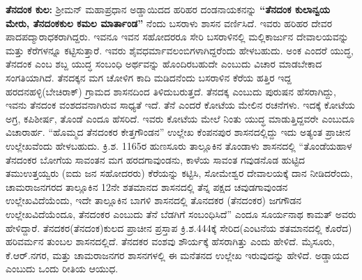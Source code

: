 \textbf{ತೆನದಂಕ ಕುಲ:} ಶ‍್ರೀಮನ್​ ಮಹಾಪ್ರಧಾನ ಅಡ್ಡಾಯಿದದ ಹರಿಹರ ದಂಡನಾಯಕನನ್ನು \textbf{“ತೆನದಂಕ ಕುಲಾನ್ವಯ ಮೇರು, ತೆನದಂಕಕುಲ ಕಮಲ ಮಾರ್ತಾಂಡ”} ನೆಂದು ಬಸರಾಳು ಶಾಸನ ವರ್ಣಿಸಿದೆ. ಇವರು ಹರಿಹರ ದೇವರ ಪಾದಪದ್ಮಾರಾಧಕರಾಗಿದ್ದರು. ಇವನೂ ಇವನ ಸಹೋದರರೂ ಸೇರಿ ಬಸರಾಳಿನಲ್ಲಿ ಮಲ್ಲಿಕಾರ್ಜುನ ದೇವಾಲಯವನ್ನು ಮತ್ತು ಕೆರೆಗಳನ್ನೂ ಕಟ್ಟಿಸುತ್ತಾರೆ. ಇವರು ಶೈವಧರ್ಮಾವಲಂಬಿಗಳಾಗಿದ್ದರೆಂದು ಹೇಳಬಹುದು. ಅಂಕ ಎಂದರೆ ಯುದ್ಧ, ತೆನದಂಕ ಎಂಬ ಶಬ್ದ ಯುದ್ಧ ಸಂಬಂಧಿ ಅರ್ಥವನ್ನು ಹೊಂದಿರಬಹುದೇ ಎಂಬುದು ವಿಚಾರ ಮಾಡಬೇಕಾದ ಸಂಗತಿಯಾಗಿದೆ. ತೆನದಕ್ಕನ ಮಗ ಚೋಳಿಗ ಕಾದಿ ಮಡಿದನೆಂದು ಬಸರಾಳಿನ ಕೆರೆಯ ಹತ್ತಿರ ಇದ್ದ ಹರದನಹಳ್ಳಿ(ಬೇಚಿರಾಕ್​) ಗ್ರಾಮದ ಶಾಸನದಿಂದ ತಿಳಿದುಬರುತ್ತದೆ. ತೆನದಕ್ಕ ಎಂಬುದು ಪುರುಷನ ಹೆಸರಾಗಿದ್ದು, ಇವನು ತೆನದಂಕ ವಂಶದವನಾಗಿರುವ ಸಾಧ್ಯತೆ ಇದೆ. ತೆನೆ ಎಂದರೆ ಕೋಟೆಯ ಮೇಲಿನ ರಚನೆಗಳು. ಇದಕ್ಕೆ ಕೋಟೆಯ ಅಗ್ರ, ಕಪಿಶೀರ್ಷ, ತೊಂಡೆ ಎಂದೂ ಹೆಸರಿದೆ. ಇವರು ಕೋಟೆಯ ಮೇಲೆ ನಿಂತು ಯುದ್ಧ ಮಾಡುತ್ತಿದ್ದವರೇ ಎಂಬುದೂ ವಿಚಾರಾರ್ಹ. “ಹೊಮ್ಮದ ತೆನದಂಕರ ಕೇತ್ತಗೌಂಡನ” ಉಲ್ಲೇಖ ಕೆಂಪನಪುರ ಶಾಸನದಲ್ಲಿದ್ದು ಇದು ಅತ್ಯಂತ ಪ್ರಾಚೀನ ಉಲ್ಲೇಖವೆಂದು ಹೇಳಬಹುದು. ಕ್ರಿ.ಶ. 1165ರ ಹುಣಸೂರು ತಾಲ್ಲೂಕಿನ ತೊಂಡಾಳು ಶಾಸನದಲ್ಲಿ “ತೊಂಡೆಯಹಾಳ ತೆನದಂಕರ ಬೋಗೆಯ ಸಾವಂತನ ಮಗ ಹರದಗಾವುಂಡನು, ಕಾಳೆಯ ಸಾವಂತ ಗವುಡನೊಡ ಹುಟ್ಟಿದ ತಮುಉತ್ತಯ್ವರು (ಐದು ಜನ ಸಹೋದರರು) ಕೆರೆಯನ್ನು ಕಟ್ಟಿಸಿ, ಸೋಮೇಶ್ವರ ದೇವಾಲಯಕ್ಕೆ ದಾನ ನೀಡಿದರೆಂದು, ಚಾಮರಾಜನಗರದ ತಾಲ್ಲೂಕಿನ 12ನೇ ಶತಮಾನದ ಶಾಸನದಲ್ಲಿ ತೆನ್ನ ಪಕ್ಷದ ಚವುಡಗಾವುಂಡನ ಉಲ್ಲೇಖವಿದೆಯೆಂದು, ಇದೇ ತಾಲ್ಲೂಕಿನ ಬಾಗಳಿ ಶಾಸನದಲ್ಲಿ ತೊನದಕರ (ತೆನದಂಕರ) ಜಗಗೌಡನ ಉಲ್ಲೇಖವಿದೆಯೆಂದೂ, ತೆನದಂಕರ ಎಂಬುದು ತೆನೆ ಬೆಡಗಿಗೆ ಸಂಬಂಧಿಸಿದೆ” ಎಂದೂ ಸೂರ್ಯನಾಥ ಕಾಮತ್​ ಅವರು ಹೇಳಿದ್ದಾರೆ. ತೆನದಕರ(ತೆನದಂಕ)ಕುಲದ ಪ್ರಾಚೀನ ಪ್ರಸ್ತಾಪ ಕ್ರಿ.ಶ.444ಕ್ಕೆ ಸೇರಿದ(ಎಂಟನೆಯ ಶತಮಾನದಲ್ಲಿ ಕೊರೆದ) ಹರಿವರ್ಮನ ತುಂಬಲ ಶಾಸನದಲ್ಲಿದೆ. ತೆನದಕರ ವಂಶವು ಶೌರ್ಯಕ್ಕೆ ಹೆಸರಾಗಿತ್ತು ಎಂದು ಹೇಳಿದೆ. ಮೈಸೂರು, ಕೆ.ಆರ್​.ನಗರ, ಮತ್ತು ಚಾಮರಾಜನಗರ ಶಾಸನಗಳಲ್ಲಿ ಈ ಮನೆತನದ ಉಲ್ಲೇಖ ಇರುವುದನ್ನು ಹೇಳಿದೆ. ಅಡ್ಡಾಯದ ಎಂಬುದು ಒಂದು ರೀತಿಯ ಆಯುಧ.

